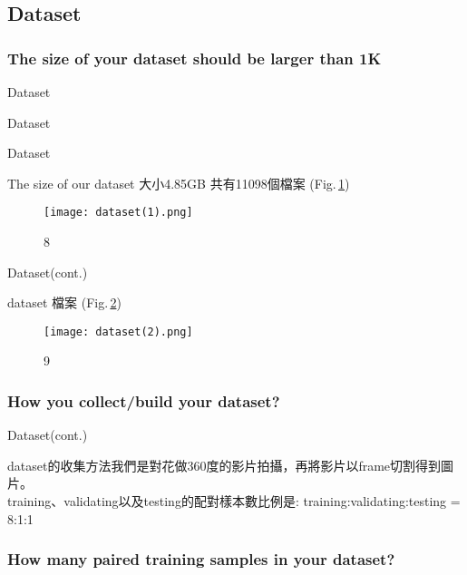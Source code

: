 \documentclass{beamer}
\begin{document}
\subsection{Dataset}
\subsubsection{The size of your dataset should be larger than 1K}

\begin{frame}{Dataset}

\center \huge Dataset
\end{frame}

\begin{frame}{Dataset}
  \begin{CJK}{UTF8}{bkai}
The size of our dataset  大小4.85GB 共有11098個檔案 (Fig.\,\ref{fig:8})
   \end{CJK}
 \begin{figure}
    \texttt{[image: dataset(1).png]}
    \caption{8}
    \label{fig:8}
  \end{figure}

\end{frame}


\begin{frame}{Dataset(cont.)}
 \begin{CJK}{UTF8}{bkai}
dataset 檔案 (Fig.\,\ref{fig:9})
 \begin{figure}
    \texttt{[image: dataset(2).png]}
    \caption{9}
    \label{fig:9}
  \end{figure}
  \end{CJK}
\end{frame}

\subsubsection{How you collect/build your dataset?}
\begin{frame}{Dataset(cont.)}
  \begin{CJK}{UTF8}{bkai}
	dataset的收集方法我們是對花做360度的影片拍攝，再將影片以frame切割得到圖片。\\
           \bigskip
   	training、validating以及testing的配對樣本數比例是:
	training:validating:testing = 8:1:1
   \end{CJK}
\end{frame}

\subsubsection{How many paired training samples in your dataset?}
\end{document}
